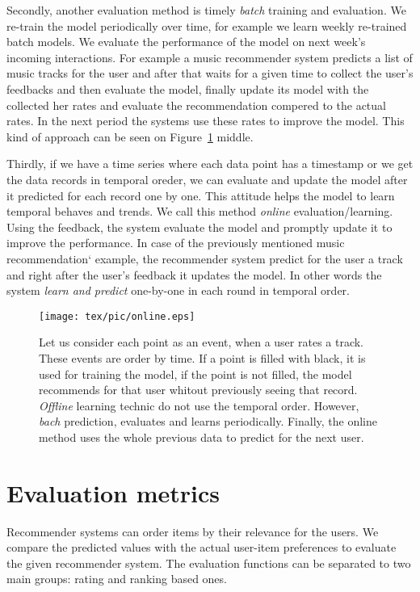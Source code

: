 Secondly, another evaluation method is timely \emph{batch} training and evaluation.
We re-train the model periodically over time, for example we learn weekly re-trained batch models.
We evaluate the performance of the model on next week's incoming interactions.
For example a music recommender system predicts a list of music tracks for the user and after that 
waits for a given time to collect the user's feedbacks and then evaluate the model, finally update its model with the 
collected her rates and evaluate the recommendation compered to the actual rates. In the next period the
systems use these rates to improve  the model. 
This kind of approach can be seen on Figure~\ref{fig:online} middle.

Thirdly, if we have a time series where each data point has a timestamp or we get the data records in temporal oreder, we can
evaluate and update the model after it predicted for each record one by one. This attitude helps
the model to learn temporal behaves and trends. We call this method \emph{online}
evaluation/learning.  Using the feedback, the system evaluate the model and promptly   update it to
improve the performance. In case of the  previously mentioned music recommendation` example, the recommender system predict for 
the user a track and right after the user's feedback it updates the model. In other
words the system \emph{learn and predict} one-by-one in each round in temporal order.


\begin{figure}[''placement specifier''] \label{fig:online}
\centering 
\texttt{[image: tex/pic/online.eps]}
\caption{Let us consider each point as an event, when a user rates a track. These events are order by time.
If a point is filled with black, it is used for training the model, if the point is not filled, the model 
recommends for that user whitout previously seeing that record. 
\emph{Offline} learning technic do not use the temporal order. However, \emph{bach} prediction, 
evaluates and learns periodically. Finally, the online method uses the whole previous data to predict for the next user. }
\end{figure}

\section{Evaluation metrics }\label{sec:eval}
Recommender systems can order items by their relevance for the users. We compare the
predicted values with the actual user-item preferences to evaluate the given recommender
system. The evaluation functions can be separated to two main groups: rating and ranking  based ones.

